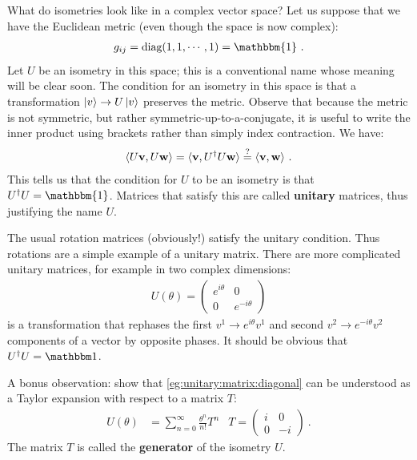 \documentclass[12pt]{article}
\begin{document}
\begin{example} What do isometries look like in a complex vector space? Let us suppose that we have the Euclidean metric (even though the space is now complex):
\begin{align}
    g_{ij} = \text{diag}(1,1,\cdots, 1) = \mathbbm{1} \ .
\end{align}
Let $U$ be an isometry in this space; this is a conventional name whose meaning will be clear soon. The condition for an isometry in this space is that a transformation $\left|v\right\rangle \to U\left|v\right\rangle$ preserves the metric. Observe that because the metric is not symmetric, but rather symmetric-up-to-a-conjugate, it is useful to write the inner product using brackets rather than simply index contraction. We have:
\begin{align}
    \langle U\mathbf{v}, U\mathbf{w} \rangle = \langle \mathbf{v}, U^\dag U \mathbf{w} \rangle \stackrel{?}{=} \langle \mathbf{v}, \mathbf{w} \rangle \ .
\end{align}
This tells us that the condition for $U$ to be an isometry is that $U^\dag U = \mathbbm{1}$. Matrices that satisfy this are called \textbf{unitary} matrices, thus justifying the name $U$. 
\end{example}

\begin{example}
The usual rotation matrices (obviously!) satisfy the unitary condition. Thus rotations are a simple example of a unitary matrix. There are more complicated unitary matrices, for example in two complex dimensions:
\begin{align}
    U(\theta) = 
    \begin{pmatrix}
        e^{i\theta} & 0\\
        0 & e^{-i\theta}
    \end{pmatrix}
    \label{eg:unitary:matrix:diagonal}
\end{align}
is a transformation that rephases the first $v^1 \to e^{i\theta}v^1$  and second $v^2 \to e^{-i\theta}v^2$ components of a vector by opposite phases. It should be obvious that $U^\dag U = \one$. 
\end{example}


\begin{exercise}
A bonus observation: show that \eqref{eg:unitary:matrix:diagonal} can be understood as a Taylor expansion with respect to a matrix $T$:
\begin{align}
    U(\theta) &= \sum_{n=0}^\infty \frac{\theta^n}{n!} T^n
    &
    T=
    \begin{pmatrix}
        i & 0\\
        0 & -i
    \end{pmatrix} \ .
\end{align}
The matrix $T$ is called the \textbf{generator} of the isometry $U$. 
\end{exercise}
\end{document}
